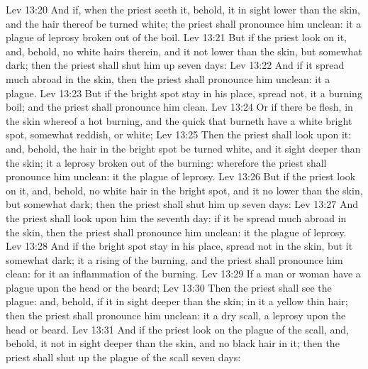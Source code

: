 \vs Lev 13:20 And if, when the priest seeth it, behold, it  in sight lower than the skin, and the hair thereof be turned white; the priest shall pronounce him unclean: it  a plague of leprosy broken out of the boil.
\vs Lev 13:21 But if the priest look on it, and, behold,  no white hairs therein, and  it  not lower than the skin, but  somewhat dark; then the priest shall shut him up seven days:
\vs Lev 13:22 And if it spread much abroad in the skin, then the priest shall pronounce him unclean: it  a plague.
\vs Lev 13:23 But if the bright spot stay in his place,  spread not, it  a burning boil; and the priest shall pronounce him clean.
\vs Lev 13:24 Or if there be  flesh, in the skin whereof  a hot burning, and the quick  that burneth have a white bright spot, somewhat reddish, or white;
\vs Lev 13:25 Then the priest shall look upon it: and, behold,  the hair in the bright spot be turned white, and it  sight deeper than the skin; it  a leprosy broken out of the burning: wherefore the priest shall pronounce him unclean: it  the plague of leprosy.
\vs Lev 13:26 But if the priest look on it, and, behold,  no white hair in the bright spot, and it  no lower than the  skin, but  somewhat dark; then the priest shall shut him up seven days:
\vs Lev 13:27 And the priest shall look upon him the seventh day:  if it be spread much abroad in the skin, then the priest shall pronounce him unclean: it  the plague of leprosy.
\vs Lev 13:28 And if the bright spot stay in his place,  spread not in the skin, but it  somewhat dark; it  a rising of the burning, and the priest shall pronounce him clean: for it  an inflammation of the burning.
\vs Lev 13:29 If a man or woman have a plague upon the head or the beard;
\vs Lev 13:30 Then the priest shall see the plague: and, behold, if it  in sight deeper than the skin;  in it a yellow thin hair; then the priest shall pronounce him unclean: it  a dry scall,  a leprosy upon the head or beard.
\vs Lev 13:31 And if the priest look on the plague of the scall, and, behold, it  not in sight deeper than the skin, and  no black hair in it; then the priest shall shut up  the plague of the scall seven days:
